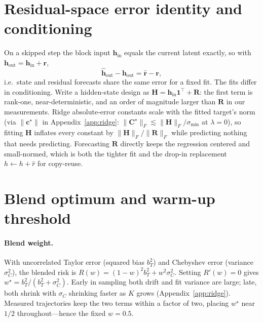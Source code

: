 \documentclass[10pt,twocolumn,letterpaper]{article}
\begin{document}
\section{Residual-space error identity and conditioning}
\label{app:residual}

On a skipped step the block input $\mathbf{h}_{\mathrm{in}}$ equals the
current latent exactly, so with $\mathbf{h}_{\mathrm{out}} = \mathbf{h}_{\mathrm{in}} + \mathbf{r}$,
\begin{equation}
  \hat{\mathbf{h}}_{\mathrm{out}} - \mathbf{h}_{\mathrm{out}}
  = \hat{\mathbf{r}} - \mathbf{r},
\end{equation}
i.e.\ state and residual forecasts share the same error for a fixed fit.
The fits differ in conditioning. Write a hidden-state design as
$\mathbf{H} = \mathbf{h}_{\mathrm{in}}\mathbf{1}^\top + \mathbf{R}$: the
first term is rank-one, near-deterministic, and an order of magnitude
larger than $\mathbf{R}$ in our measurements. Ridge absolute-error
constants scale with the fitted target's norm (via $\|\mathbf{c}^\star\|$
in Appendix~\ref{app:ridge}: $\|\mathbf{C}^\star\|_F \lesssim
\|\mathbf{H}\|_F/\sigma_{\min}$ at $\lambda = 0$), so fitting $\mathbf{H}$
inflates every constant by $\|\mathbf{H}\|_F/\|\mathbf{R}\|_F$ while
predicting nothing that needs predicting. Forecasting $\mathbf{R}$
directly keeps the regression centered and small-normed, which is both the
tighter fit and the drop-in replacement $h \gets h + \hat{r}$ for
copy-reuse.

\section{Blend optimum and warm-up threshold}
\label{app:blend}

\paragraph{Blend weight.} With uncorrelated Taylor error (squared bias
$b_T^2$) and Chebyshev error (variance $\sigma_C^2$), the blended risk is
$R(w) = (1-w)^2 b_T^2 + w^2\sigma_C^2$. Setting $R'(w) = 0$ gives
$w^\star = b_T^2/(b_T^2 + \sigma_C^2)$. Early in sampling both drift and
fit variance are large; late, both shrink with $\sigma_C$ shrinking faster
as $K$ grows (Appendix~\ref{app:ridge}). Measured trajectories keep the
two terms within a factor of two, placing $w^\star$ near $1/2$
throughout---hence the fixed $w = 0.5$.
\end{document}
